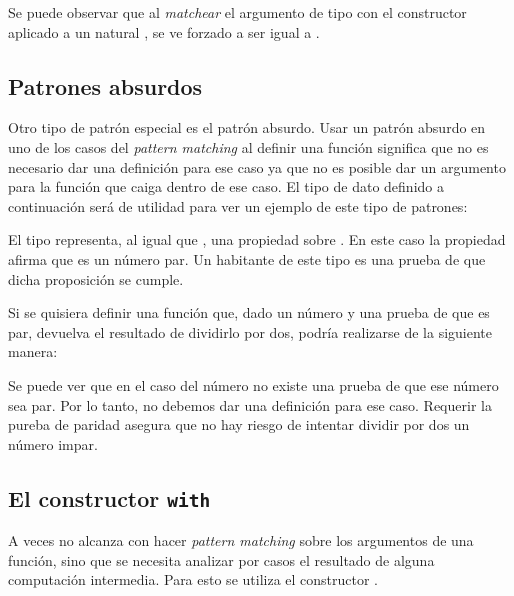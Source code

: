 
Se puede observar que al \textit{matchear} el argumento de tipo   con el constructor  aplicado a un natural ,  se ve forzado a ser igual a  \AgdaFunction{*} .


\subsection{Patrones absurdos}\label{tipos:absurdos}

Otro tipo de patrón especial es el patrón absurdo. Usar un patrón absurdo en uno de los casos del \textit{pattern matching} al definir una función significa que no es necesario dar una definición para ese caso ya que no es posible dar un argumento para la función que caiga dentro de ese caso. El tipo de dato definido a continuación será de utilidad para ver un ejemplo de este tipo de patrones:


El tipo   representa, al igual que  , una propiedad sobre . En este caso la propiedad afirma que  es un número par. Un habitante de este tipo es una prueba de que dicha proposición se cumple. 

Si se quisiera definir una función que, dado un número y una prueba de que es par, devuelva el resultado de dividirlo por dos, podría realizarse de la siguiente manera:


Se puede ver que en el caso del número  no existe una prueba de que ese número sea par. Por lo tanto, no debemos dar una definición para ese caso. Requerir la pureba de paridad asegura que no hay riesgo de intentar dividir por dos un número impar. 

\subsection{El constructor \texttt{with}}\label{tipos:with}

A veces no alcanza con hacer \textit{pattern matching} sobre los argumentos de una función, sino que se necesita analizar por casos el resultado de alguna computación intermedia. Para esto se utiliza el constructor . 

